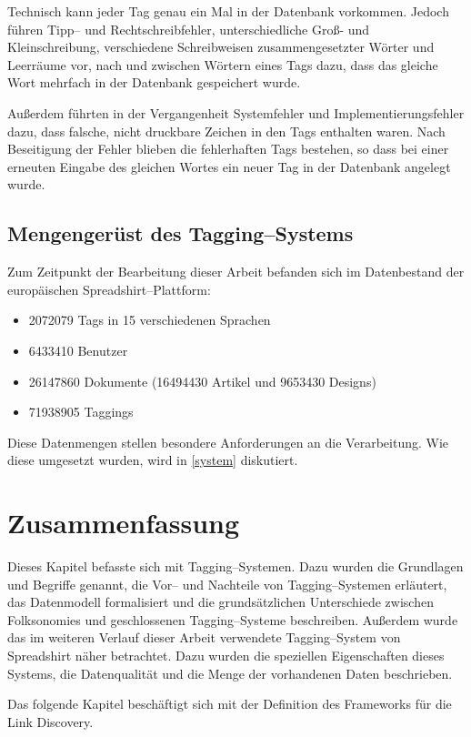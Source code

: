 Technisch kann jeder Tag genau ein Mal in der Datenbank vorkommen. Jedoch führen Tipp-- und Rechtschreibfehler, unterschiedliche Groß- und Kleinschreibung, verschiedene Schreibweisen zusammengesetzter Wörter und Leerräume vor, nach und zwischen Wörtern eines Tags dazu, dass das gleiche Wort mehrfach in der Datenbank gespeichert wurde.

Außerdem führten in der Vergangenheit Systemfehler und Implementierungsfehler dazu, dass falsche, nicht druckbare Zeichen in den Tags enthalten waren. Nach Beseitigung der Fehler blieben die fehlerhaften Tags bestehen, so dass bei einer erneuten Eingabe des gleichen Wortes ein neuer Tag in der Datenbank angelegt wurde.

\subsection{Mengengerüst des Tagging--Systems}
\label{tag_amount}

Zum Zeitpunkt der Bearbeitung dieser Arbeit befanden sich im Datenbestand der europäischen Spreadshirt--Plattform:

\begin{itemize}
    \item \num{2072079} Tags in \num{15} verschiedenen Sprachen
    \item \num{6433410} Benutzer
    \item \num{26147860} Dokumente (\num{16494430} Artikel und \num{9653430} Designs)
    \item \num{71938905} Taggings
\end{itemize}

Diese Datenmengen stellen besondere Anforderungen an die Verarbeitung. Wie diese umgesetzt wurden, wird in \cref{system} diskutiert.

\section{Zusammenfassung}

Dieses Kapitel befasste sich mit Tagging--Systemen. Dazu wurden die Grundlagen und Begriffe genannt, die Vor-- und Nachteile von Tagging--Systemen erläutert, das Datenmodell formalisiert und die grundsätzlichen Unterschiede zwischen Folksonomies und geschlossenen Tagging--Systeme beschreiben. Außerdem wurde das im weiteren Verlauf dieser Arbeit verwendete Tagging--System von Spreadshirt \cite{sprd2013} näher betrachtet. Dazu wurden die speziellen Eigenschaften dieses Systems, die Datenqualität und die Menge der vorhandenen Daten beschrieben.

Das folgende Kapitel beschäftigt sich mit der Definition des Frameworks für die Link Discovery.